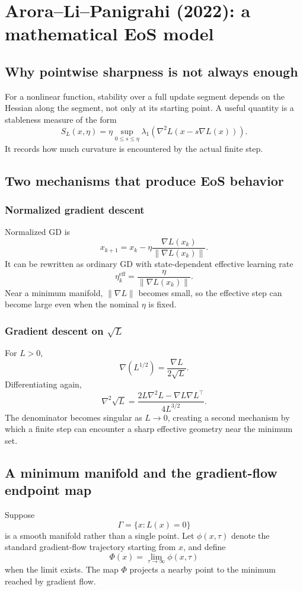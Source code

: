 \documentclass[11pt,a4paper,oneside,openany]{memoir}
\theoremstyle{definition}
\begin{document}
\chapter{Arora--Li--Panigrahi (2022): a mathematical EoS model}

\section{Why pointwise sharpness is not always enough}
For a nonlinear function, stability over a full update segment depends on the Hessian along the segment, not only at its starting point.  A useful quantity is a stableness measure of the form
\[
S_L(x,\eta)=\eta\sup_{0\le s\le\eta}
\lambda_1\!\left(\nabla^2L(x-s\nabla L(x))\right).
\]
It records how much curvature is encountered by the actual finite step.

\section{Two mechanisms that produce EoS behavior}
\subsection{Normalized gradient descent}
Normalized GD is
\[
x_{k+1}=x_k-\eta\frac{\nabla L(x_k)}{\|\nabla L(x_k)\|}.
\]
It can be rewritten as ordinary GD with state-dependent effective learning rate
\[
\eta_k^{\mathrm{eff}}=\frac{\eta}{\|\nabla L(x_k)\|}.
\]
Near a minimum manifold, $\|\nabla L\|$ becomes small, so the effective step can become large even when the nominal $\eta$ is fixed.

\subsection{Gradient descent on $\sqrt L$}
For $L>0$,
\[
\nabla\!\left(L^{1/2}\right)=\frac{\nabla L}{2\sqrt L}.
\]
Differentiating again,
\[
\nabla^2\sqrt L
=\frac{2L\nabla^2L-\nabla L\nabla L^\top}{4L^{3/2}}.
\]
The denominator becomes singular as $L\to0$, creating a second mechanism by which a finite step can encounter a sharp effective geometry near the minimum set.

\section{A minimum manifold and the gradient-flow endpoint map}
Suppose
\[
\Gamma=\{x:L(x)=0\}
\]
is a smooth manifold rather than a single point.  Let $\phi(x,\tau)$ denote the standard gradient-flow trajectory starting from $x$, and define
\[
\Phi(x)=\lim_{\tau\to\infty}\phi(x,\tau)
\]
when the limit exists.  The map $\Phi$ projects a nearby point to the minimum reached by gradient flow.
\end{document}
